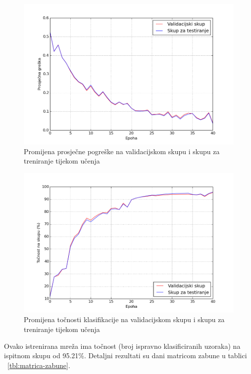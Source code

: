 \documentclass[times, utf8, zavrsni, numeric]{fer}
\begin{document}
\begin{figure}[h]
    \centering
    \includegraphics[width=14cm]{img/graf-greska.png}
    \caption{Promijena prosječne pogreške na validacijskom skupu i skupu za treniranje tijekom učenja}
    \label{fig:graf-greska}
\end{figure}

\begin{figure}[h]	
    \centering
    \includegraphics[width=14cm]{img/graf-tocnost.png}
    \caption{Promijena točnosti klasifikacije na validacijskom skupu i skupu za treniranje tijekom učenja}
    \label{fig:graf-tocnost}
\end{figure}

Ovako istrenirana mreža ima točnost (broj ispravno klasificiranih uzoraka) na ispitnom skupu od 95.21\%. Detaljni rezultati su dani matricom zabune u tablici ~\ref{tbl:matrica-zabune}.
 
\end{document}
